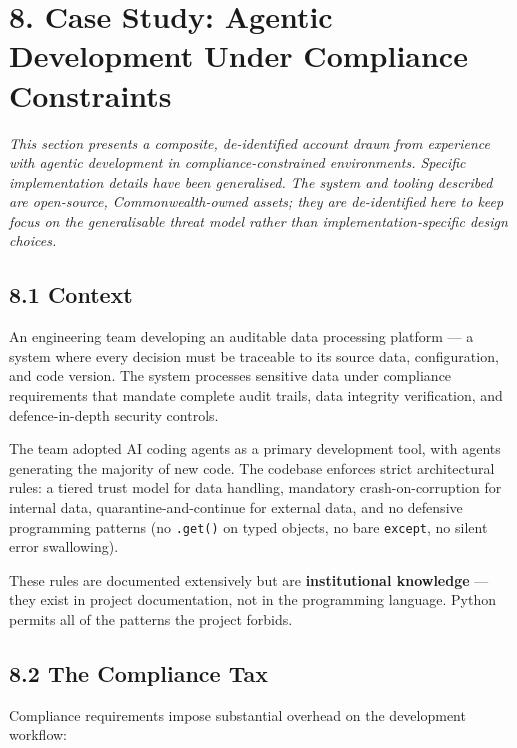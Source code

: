 \documentclass[a4paper,11pt]{report}
\begin{document}
\hypertarget{case-study-agentic-development-under-compliance-constraints}{%
\section{8. Case Study: Agentic Development Under Compliance
Constraints}\label{case-study-agentic-development-under-compliance-constraints}}

\emph{This section presents a composite, de-identified account drawn
from experience with agentic development in compliance-constrained
environments. Specific implementation details have been generalised. The
system and tooling described are open-source, Commonwealth-owned assets;
they are de-identified here to keep focus on the generalisable threat
model rather than implementation-specific design choices.}

\hypertarget{context}{%
\subsection{8.1 Context}\label{context}}

An engineering team developing an auditable data processing platform ---
a system where every decision must be traceable to its source data,
configuration, and code version. The system processes sensitive data
under compliance requirements that mandate complete audit trails, data
integrity verification, and defence-in-depth security controls.

The team adopted AI coding agents as a primary development tool, with
agents generating the majority of new code. The codebase enforces strict
architectural rules: a tiered trust model for data handling, mandatory
crash-on-corruption for internal data, quarantine-and-continue for
external data, and no defensive programming patterns (no \texttt{.get()}
on typed objects, no bare \texttt{except}, no silent error swallowing).

These rules are documented extensively but are \textbf{institutional
knowledge} --- they exist in project documentation, not in the
programming language. Python permits all of the patterns the project
forbids.

\hypertarget{the-compliance-tax}{%
\subsection{8.2 The Compliance Tax}\label{the-compliance-tax}}

Compliance requirements impose substantial overhead on the development
workflow:
\end{document}
